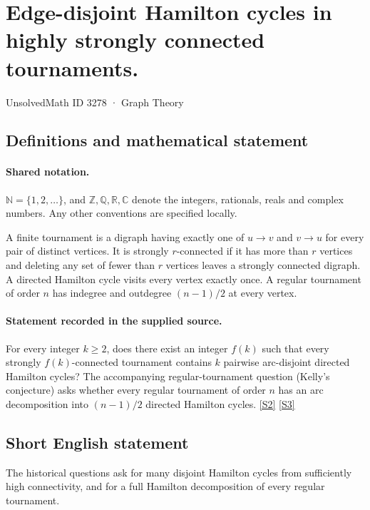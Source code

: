 \documentclass[11pt]{article}
\newcommand{\sref}[2]{\hyperlink{source:#1:#2}{[S#2]}}
\begin{document}
\setcounter{section}{3277}
\section{Edge-disjoint Hamilton cycles in highly strongly connected tournaments.}\label{3278}
{\small\sffamily UnsolvedMath ID 3278 · Graph Theory}
\subsection{Definitions and mathematical statement}

\paragraph{Shared notation.}$\mathbb N=\{1,2,\ldots\}$, and $\mathbb Z,\mathbb Q,\mathbb R,\mathbb C$ denote the integers, rationals, reals and complex numbers. Any other conventions are specified locally.


A finite tournament is a digraph having exactly one of $u\to v$ and $v\to u$ for every pair of distinct vertices. It is strongly $r$-connected if it has more than $r$ vertices and deleting any set of fewer than $r$ vertices leaves a strongly connected digraph. A directed Hamilton cycle visits every vertex exactly once. A regular tournament of order $n$ has indegree and outdegree $(n-1)/2$ at every vertex.
\paragraph{Statement recorded in the supplied source.}
For every integer $k\geq2$, does there exist an integer $f(k)$ such that every strongly $f(k)$-connected tournament contains $k$ pairwise arc-disjoint directed Hamilton cycles? The accompanying regular-tournament question (Kelly's conjecture) asks whether every regular tournament of order $n$ has an arc decomposition into $(n-1)/2$ directed Hamilton cycles. \sref{3278}{2} \sref{3278}{3}
\subsection{Short English statement}
The historical questions ask for many disjoint Hamilton cycles from sufficiently high connectivity, and for a full Hamilton decomposition of every regular tournament.
\end{document}
